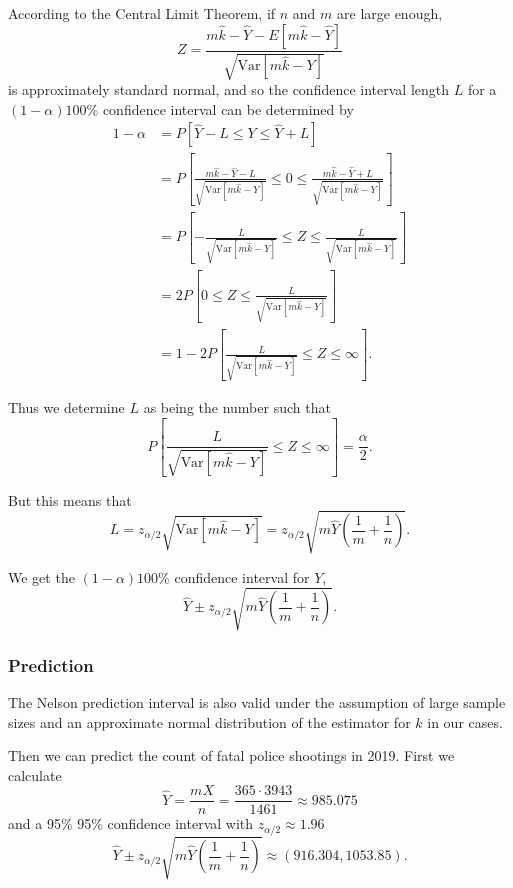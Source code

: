 \documentclass[conf]{new-aiaa}
\begin{document}
According to the Central Limit Theorem, if $n$ and $m$ are large enough, \begin{equation}
Z=\frac{m\hat{k}-\hat{Y}-E[m\hat{k}-\hat{Y}]}{\sqrt{\text{Var}[m\hat{k}-Y]}}
\end{equation}
is approximately standard normal, and so the confidence interval length $L$ for a $(1-\alpha)100\%$ confidence interval can be determined by
\begin{align*}
1-\alpha&=P[\hat{Y}-L\leqslant Y\leqslant\hat{Y}+L]\\
&=P\left[\frac{m\hat{k}-\hat{Y}-L}{\sqrt{\text{Var}[m\hat{k}-Y]}}\leqslant0\leqslant\frac{m\hat{k}-\hat{Y}+L}{\sqrt{\text{Var}[m\hat{k}-Y]}}\right]\\
&=P\left[-\frac{L}{\sqrt{\text{Var}[m\hat{k}-Y]}}\leqslant Z\leqslant\frac{L}{\sqrt{\text{Var}[m\hat{k}-Y]}}\right]\\
&=2P\left[0\leqslant Z\leqslant\frac{L}{\sqrt{\text{Var}[m\hat{k}-Y]}}\right]\\
&=1-2P\left[\frac{L}{\sqrt{\text{Var}[m\hat{k}-Y]}}\leqslant Z\leqslant\infty\right].
\end{align*}

Thus we determine $L$ as being the number such that
\begin{equation}
P\left[\frac{L}{\sqrt{\text{Var}[m\hat{k}-Y]}}\leqslant Z\leqslant\infty\right]=\frac{\alpha}{2}.
\end{equation}

But this means that
\begin{equation}
L=z_{\alpha/2}\sqrt{\text{Var}[m\hat{k}-Y]}=z_{\alpha/2}\sqrt{m\hat{Y}\left(\frac{1}{m}+\frac{1}{n}\right)}.
\end{equation}

We get the $(1 - \alpha)100\%$ confidence interval for $Y$,
\begin{equation}\label{eq:q7}
\hat{Y} \pm z_{\alpha / 2} \sqrt{m\hat{Y}\left(\frac{1}{m}+\frac{1}{n}\right)}.
\end{equation}

\subsubsection{Prediction}

The Nelson prediction interval is also valid under the assumption of large sample sizes and an approximate normal distribution of the estimator for $k$ in our cases. \medskip 

Then we can predict the count of fatal police shootings in 2019. First we calculate
$$\hat{Y}=\frac{mX}{n}=\frac{365\cdot3943}{1461}\approx985.075$$
and a 95\% 95\% confidence interval with $z_{\alpha/2}\approx1.96$
$$\hat{Y} \pm z_{\alpha / 2} \sqrt{m\hat{Y}\left(\frac{1}{m}+\frac{1}{n}\right)}\approx(916.304, 1053.85).$$
\end{document}
